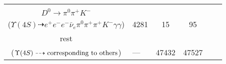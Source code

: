 \documentclass[landscape]{article}
\newcounter{rownumbers}
\newcommand\rn{\stepcounter{rownumbers}\arabic{rownumbers}}
\newcommand{\EOL}{\\ \hline}
\newcommand{\topoTags}[1]{#1}
\begin{document}
\begin{longtable}{|c|l|c|c|c|c|}
\rn & \makecell[l]{ $ 
\Upsilon(4S) \rightarrow \bar{B}^{0} \bar{B}^{0} ,
\bar{B}^{0} \rightarrow \eta J/\psi ,
\bar{B}^{0} \rightarrow e^{-} \bar{\nu}_{e} D^{*+} ,
\eta \rightarrow \gamma \gamma ,
J/\psi \rightarrow e^{+} e^{-} ,
D^{*+} \rightarrow \pi^{+} D^{0} ,
$ \\ $
D^{0} \rightarrow \pi^{0} \pi^{+} K^{-} 
$ \\ ($
\Upsilon(4S) \dashrightarrow e^{+} e^{-} e^{-} \bar{\nu}_{e} \pi^{0} \pi^{+} \pi^{+} K^{-} \gamma \gamma 
$) } & \topoTags{4281 & }15 & 95 \EOL

rest & \makecell[l]{ $ 
\Upsilon(4S) \rightarrow \rm{others \  (44978 \  in \  total)}
$ \\ ($
\Upsilon(4S) \dashrightarrow \rm{corresponding\ to\ others}
$) } & \topoTags{--- & }47432 & 47527 \EOL

\end{longtable}
\end{document}
